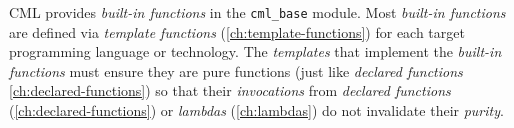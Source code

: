 CML provides \emph{built-in functions} in the \verb|cml_base| module.
Most \emph{built-in functions} are defined via \emph{template functions} (\ref{ch:template-functions})
for each target programming language or technology.
The \emph{templates} that implement the \emph{built-in functions}
must ensure they are pure functions (just like \emph{declared functions} \ref{ch:declared-functions})
so that their \emph{invocations} from
\emph{declared functions} (\ref{ch:declared-functions})
or \emph{lambdas} (\ref{ch:lambdas}) do not invalidate their \emph{purity}.
